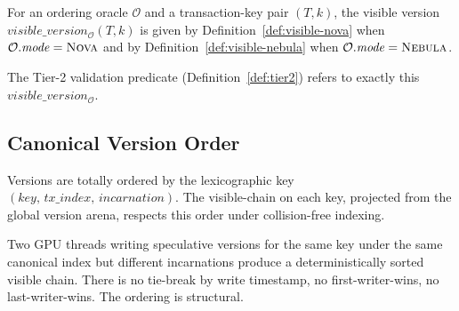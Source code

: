 \begin{definition}
\label{def:visible}
For an ordering oracle $\mathcal{O}$ and a transaction-key pair
$(T, k)$, the visible version $\mathit{visible\_version}_\mathcal{O}(T,
k)$ is given by Definition~\ref{def:visible-nova} when
$\mathcal{O}.\mathit{mode} = \textsc{Nova}$ and by
Definition~\ref{def:visible-nebula} when $\mathcal{O}.\mathit{mode} =
\textsc{Nebula}$.
\end{definition}

The Tier-2 validation predicate (Definition~\ref{def:tier2}) refers to
exactly this $\mathit{visible\_version}_\mathcal{O}$.

\subsection{Canonical Version Order}

\begin{definition}
\label{def:version-order}
Versions are totally ordered by the lexicographic key
$(\mathit{key},\, \mathit{tx\_index},\, \mathit{incarnation})$. The
visible-chain on each key, projected from the global version arena,
respects this order under collision-free indexing.
\end{definition}

\begin{remark}
\label{rem:no-race}
Two GPU threads writing speculative versions for the same key under
the same canonical index but different incarnations produce a
deterministically sorted visible chain. There is no tie-break by
write timestamp, no first-writer-wins, no last-writer-wins. The
ordering is structural.
\end{remark}


